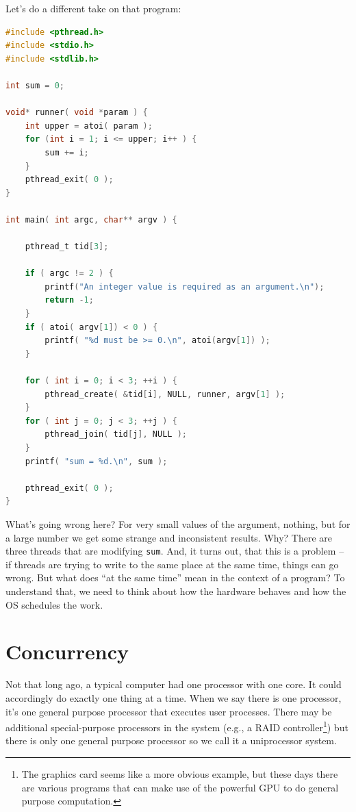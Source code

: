 Let's do a different take on that program:

\begin{lstlisting}[language=C]
#include <pthread.h>
#include <stdio.h>
#include <stdlib.h>

int sum = 0;

void* runner( void *param ) {
    int upper = atoi( param );
    for (int i = 1; i <= upper; i++ ) {
        sum += i;
    }
    pthread_exit( 0 );
}

int main( int argc, char** argv ) { 

    pthread_t tid[3];

    if ( argc != 2 ) {
        printf("An integer value is required as an argument.\n");
        return -1; 
    }   
    if ( atoi( argv[1]) < 0 ) {
        printf( "%d must be >= 0.\n", atoi(argv[1]) );
    }   

    for ( int i = 0; i < 3; ++i ) { 
        pthread_create( &tid[i], NULL, runner, argv[1] );
    }   
    for ( int j = 0; j < 3; ++j ) { 
        pthread_join( tid[j], NULL );
    }   
    printf( "sum = %d.\n", sum );
    
    pthread_exit( 0 );
}
\end{lstlisting}

What's going wrong here? For very small values of the argument, nothing, but for a large number we get some strange and inconsistent results. Why? There are three threads that are modifying \texttt{sum}. And, it turns out, that this is a problem -- if threads are trying to write to the same place at the same time, things can go wrong. But what does ``at the same time'' mean in the context of a program? To understand that, we need to think about how the hardware behaves and how the OS schedules the work.

\section*{Concurrency}

Not that long ago, a typical computer had one processor with one core. It could accordingly do exactly one thing at a time. When we say there is one processor, it's one general purpose processor that executes user processes. There may be additional special-purpose processors in the system (e.g., a RAID controller\footnote{The graphics card seems like a more obvious example, but these days there are various programs that can make use of the powerful GPU to do general purpose computation.}) but there is only one general purpose processor so we call it a uniprocessor system.

